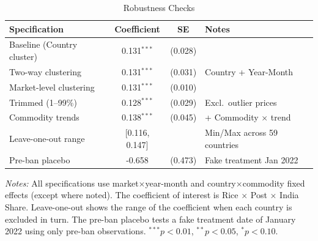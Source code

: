 \begin{table}[htbp]
\centering
\caption{Robustness Checks}
\label{tab:robust}
\begin{threeparttable}
\begin{tabular}{lccl}
\hline\hline
Specification & Coefficient & SE & Notes \\
\hline
Baseline (Country cluster) & 0.131$^{***}$ & (0.028) & \\
Two-way clustering & 0.131$^{***}$ & (0.031) & Country + Year-Month \\
Market-level clustering & 0.131$^{***}$ & (0.010) & \\
Trimmed (1--99\%) & 0.128$^{***}$ & (0.029) & Excl.\ outlier prices \\
Commodity trends & 0.138$^{***}$ & (0.045) & + Commodity $\times$ trend \\
Leave-one-out range & [0.116, 0.147] & & Min/Max across 59 countries \\
Pre-ban placebo & -0.658 & (0.473) & Fake treatment Jan 2022 \\
\hline\hline
\end{tabular}
\begin{tablenotes}[flushleft]\small
\item \textit{Notes:} All specifications use market$\times$year-month and country$\times$commodity fixed effects (except where noted). The coefficient of interest is Rice $\times$ Post $\times$ India Share. Leave-one-out shows the range of the coefficient when each country is excluded in turn. The pre-ban placebo tests a fake treatment date of January 2022 using only pre-ban observations. $^{***}p<0.01$, $^{**}p<0.05$, $^{*}p<0.10$.
\end{tablenotes}
\end{threeparttable}
\end{table}
